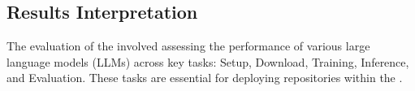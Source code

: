 \subsection{Results Interpretation} \label{results}
The evaluation of the \model involved assessing the performance of various large language models (LLMs) across key tasks: Setup, Download, Training, Inference, and Evaluation. These tasks are essential for deploying repositories within the \model.
















